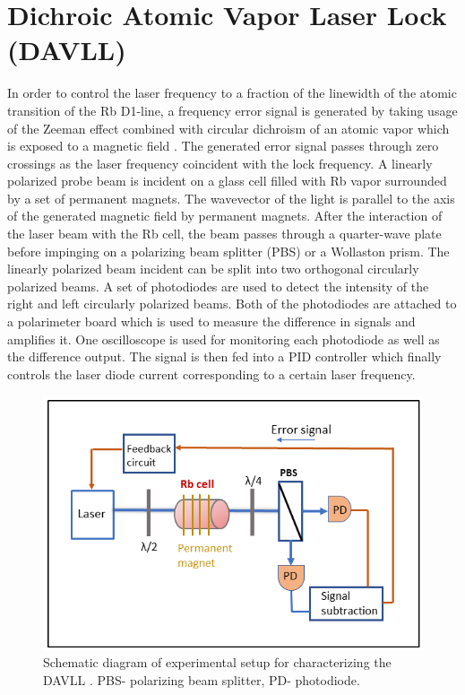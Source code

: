 \section{Dichroic Atomic Vapor Laser Lock (DAVLL)}
\medskip
In order to control the laser frequency to a fraction of the linewidth of the atomic transition of the Rb D1-line, a frequency error signal is generated by taking usage of the Zeeman effect combined with circular dichroism of an atomic vapor which is exposed to a magnetic field \cite{doi:10.1063/1.3568824}. The generated error signal passes through zero crossings as the laser frequency coincident with the lock frequency. A linearly polarized probe beam is incident on a glass cell filled with Rb vapor surrounded by a set of permanent magnets. The wavevector of the light is parallel to the axis of the generated magnetic field by permanent magnets. After the interaction of the laser beam with the Rb cell, the beam passes through a quarter-wave plate before impinging on a polarizing beam splitter (PBS) or a Wollaston prism. The linearly polarized beam incident can be split into two orthogonal circularly polarized beams. A set of photodiodes are used to detect the intensity of the right and left circularly polarized beams. Both of the photodiodes are attached to a polarimeter board which is used to measure the difference in signals and amplifies it. One oscilloscope is used for monitoring each photodiode as well as the difference output. The signal is then fed into a PID controller which finally controls the laser diode current corresponding to a certain laser frequency.
\begin{figure}[h]
\centering
\includegraphics[width=0.8\linewidth]{figures/DAVLL}
\caption{Schematic diagram of experimental setup for characterizing the DAVLL . PBS- polarizing beam splitter, PD- photodiode.}
\end{figure}

